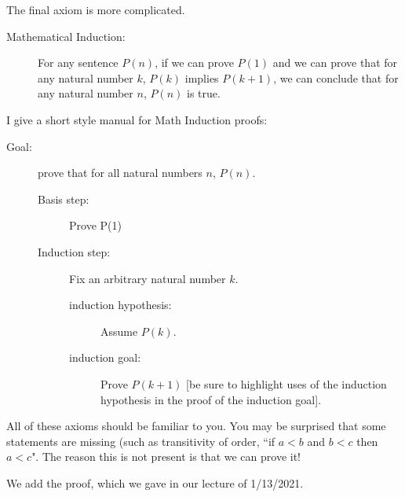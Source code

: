 \documentclass[12pt]{article}
\begin{document}
The final axiom is more complicated.

\begin{description}

\item[Mathematical Induction:]  For any sentence $P(n)$, if we can prove $P(1)$ and we can prove that for
any natural number $k$, $P(k)$ implies $P(k+1)$, we can conclude that for any natural number $n$, $P(n)$ is true.

\end{description}

\newpage

I give a short style manual for Math Induction proofs:

\begin{description}

\item[Goal:]  prove that for all natural numbers $n$, $P(n)$.

\begin{description}

\item[Basis step:]  Prove P(1)

\item[Induction step:]

Fix an arbitrary natural number $k$.

\begin{description}

\item[induction hypothesis:]  Assume $P(k)$.

\item[induction goal:]  Prove $P(k+1)$ [be sure to highlight uses of the induction hypothesis in the proof of the induction goal].

\end{description}


\end{description}

\end{description}

All of these axioms should be familiar to you.  You may be surprised that some statements are missing (such as transitivity of order, ``if $a<b$ and $b<c$ then $a<c$".   The reason this is not present is that we can prove it!

We add the proof, which we gave in our lecture of 1/13/2021.
\end{document}
